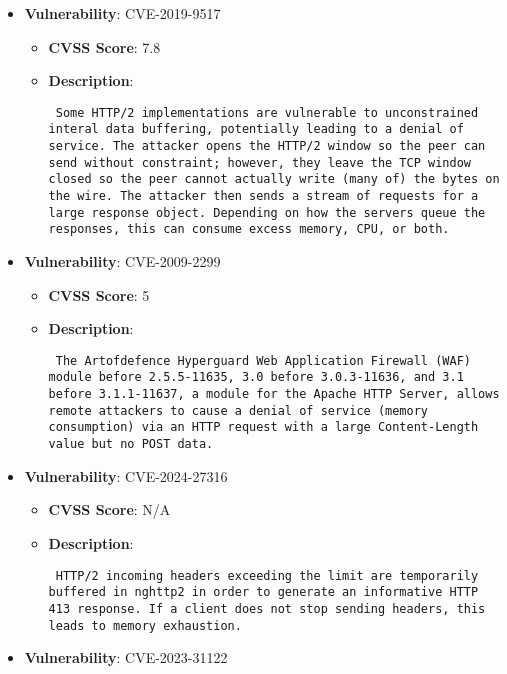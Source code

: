 \documentclass{article}
\begin{document}
\begin{itemize}
        \item \textbf{Vulnerability}: CVE-2019-9517
        \begin{itemize}
            \item \textbf{CVSS Score}:  7.8 
            \item \textbf{Description}: \parbox{\linewidth}{\texttt{ Some HTTP/2 implementations are vulnerable to unconstrained interal data buffering, potentially leading to a denial of service. The attacker opens the HTTP/2 window so the peer can send without constraint; however, they leave the TCP window closed so the peer cannot actually write (many of) the bytes on the wire. The attacker then sends a stream of requests for a large response object. Depending on how the servers queue the responses, this can consume excess memory, CPU, or both. }}
        \end{itemize}
    
        \item \textbf{Vulnerability}: CVE-2009-2299
        \begin{itemize}
            \item \textbf{CVSS Score}:  5 
            \item \textbf{Description}: \parbox{\linewidth}{\texttt{ The Artofdefence Hyperguard Web Application Firewall (WAF) module before 2.5.5-11635, 3.0 before 3.0.3-11636, and 3.1 before 3.1.1-11637, a module for the Apache HTTP Server, allows remote attackers to cause a denial of service (memory consumption) via an HTTP request with a large Content-Length value but no POST data. }}
        \end{itemize}
    
        \item \textbf{Vulnerability}: CVE-2024-27316
        \begin{itemize}
            \item \textbf{CVSS Score}:  N/A 
            \item \textbf{Description}: \parbox{\linewidth}{\texttt{ HTTP/2 incoming headers exceeding the limit are temporarily buffered in nghttp2 in order to generate an informative HTTP 413 response. If a client does not stop sending headers, this leads to memory exhaustion. }}
        \end{itemize}
    
        \item \textbf{Vulnerability}: CVE-2023-31122
\end{itemize}
\end{document}
